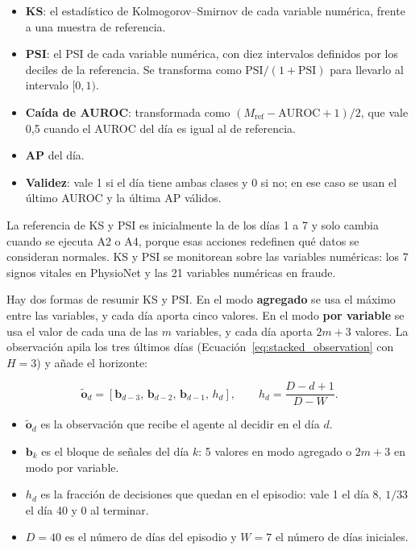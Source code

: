 \begin{itemize}
    \item \textbf{KS}: el estadístico de Kolmogorov--Smirnov de cada variable numérica, frente a
    una muestra de referencia.
    \item \textbf{PSI}: el PSI de cada variable numérica, con diez intervalos definidos por los
    deciles de la referencia. Se transforma como $\text{PSI}/(1+\text{PSI})$ para llevarlo al
    intervalo $[0, 1)$.
    \item \textbf{Caída de AUROC}: transformada como $(M_{\text{ref}} - \text{AUROC} + 1)/2$,
    que vale 0,5 cuando el AUROC del día es igual al de referencia.
    \item \textbf{AP} del día.
    \item \textbf{Validez}: vale 1 si el día tiene ambas clases y 0 si no; en ese caso se usan el
    último AUROC y la última AP válidos.
\end{itemize}

La referencia de KS y PSI es inicialmente la de los días 1 a 7 y solo cambia cuando se ejecuta
A2 o A4, porque esas acciones redefinen qué datos se consideran normales. KS y PSI se monitorean
sobre las variables numéricas: los 7 signos vitales en PhysioNet y las 21 variables numéricas en
fraude.

Hay dos formas de resumir KS y PSI. En el modo \textbf{agregado} se usa el máximo entre las
variables, y cada día aporta cinco valores. En el modo \textbf{por variable} se usa el valor de
cada una de las $m$ variables, y cada día aporta $2m + 3$ valores. La observación apila los tres
últimos días (Ecuación~\ref{eq:stacked_observation} con $H = 3$) y añade el horizonte:

\begin{equation}
    \tilde{\mathbf{o}}_d = \left[\mathbf{b}_{d-3},\, \mathbf{b}_{d-2},\, \mathbf{b}_{d-1},\, h_d\right],
    \qquad
    h_d = \frac{D - d + 1}{D - W}.
    \label{eq:darl_observation}
\end{equation}

\begin{itemize}
    \item $\tilde{\mathbf{o}}_d$ es la observación que recibe el agente al decidir en el día $d$.
    \item $\mathbf{b}_k$ es el bloque de señales del día $k$: 5 valores en modo agregado o $2m + 3$ en modo por variable.
    \item $h_d$ es la fracción de decisiones que quedan en el episodio: vale 1 el día 8, $1/33$ el día 40 y 0 al terminar.
    \item $D = 40$ es el número de días del episodio y $W = 7$ el número de días iniciales.
\end{itemize}


